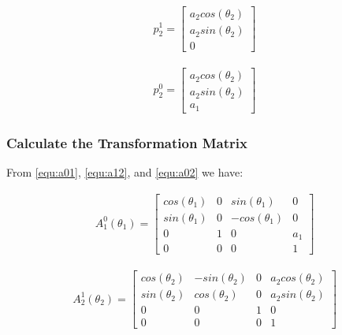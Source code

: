 \documentclass[a4paper, titlepage]{article}
\begin{document}
\begin{equation}
\begin{split}
p^1_{2} = 
\begin{bmatrix}
a_{2}cos(\theta_{2}) \\ 
a_{2}sin(\theta_{2}) \\ 
0
\end{bmatrix}
\end{split}
\end{equation}


\begin{equation}
\begin{split}
p^0_{2} = 
\begin{bmatrix}
a_{2}cos(\theta_{2}) \\ 
a_{2}sin(\theta_{2}) \\ 
a_{1}
\end{bmatrix}
\end{split}
\end{equation}


\subsubsection{Calculate the Transformation Matrix}

From \ref{equ:a01}, \ref{equ:a12}, and \ref{equ:a02} we have:

\begin{equation}
\begin{split}
A^0_{1}(\theta_{1}) = 
\begin{bmatrix}
cos(\theta_{1}) & 0 & sin(\theta_{1}) & 0 \\ 
sin(\theta_{1}) & 0 & -cos(\theta_{1}) & 0  \\ 
0 & 1 & 0 & a_{1} \\
0 & 0 & 0 & 1
\end{bmatrix}
\end{split}
\end{equation}


\begin{equation}
\begin{split}
A^1_{2}(\theta_{2}) = 
\begin{bmatrix}
cos(\theta_{2})  & -sin(\theta_{2}) & 0 & a_{2}cos(\theta_{2})\\ 
sin(\theta_{2})  & cos(\theta_{2}) & 0  & a_{2}sin(\theta_{2})\\ 
0 & 0 & 1 & 0 \\
0 & 0 & 0 & 1
\end{bmatrix}
\end{split}
\end{equation}
\end{document}
